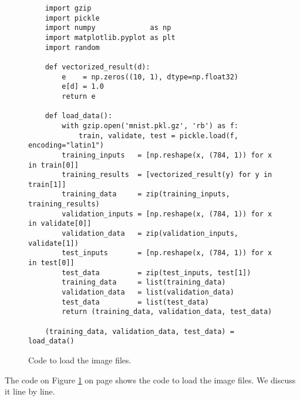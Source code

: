 \begin{figure}[!ht]
\centering
\begin{verbatim}
    import gzip
    import pickle
    import numpy             as np
    import matplotlib.pyplot as plt
    import random

    def vectorized_result(d):
        e    = np.zeros((10, 1), dtype=np.float32)
        e[d] = 1.0
        return e

    def load_data():
        with gzip.open('mnist.pkl.gz', 'rb') as f:
            train, validate, test = pickle.load(f, encoding="latin1")
        training_inputs   = [np.reshape(x, (784, 1)) for x in train[0]]
        training_results  = [vectorized_result(y) for y in train[1]]
        training_data     = zip(training_inputs, training_results)
        validation_inputs = [np.reshape(x, (784, 1)) for x in validate[0]]
        validation_data   = zip(validation_inputs, validate[1])
        test_inputs       = [np.reshape(x, (784, 1)) for x in test[0]]
        test_data         = zip(test_inputs, test[1])
        training_data     = list(training_data)
        validation_data   = list(validation_data)
        test_data         = list(test_data)
        return (training_data, validation_data, test_data)        

    (training_data, validation_data, test_data) = load_data()
\end{verbatim}
\vspace*{-0.3cm}
\caption{Code to load the image files.}
\label{fig:Digit-Regocnition.ipynb-1}
\end{figure}
The code on Figure \ref{fig:Digit-Regocnition.ipynb-1} on page \pageref{fig:Digit-Regocnition.ipynb-1} shows the
code to load the image files.  We discuss it line by line.
